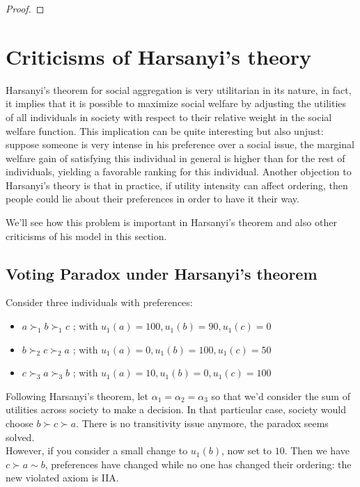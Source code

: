 \documentclass[12pt]{report}
\begin{document}
\begin{proof}

\end{proof}

\section{Criticisms of Harsanyi's  theory}

Harsanyi's theorem for social aggregation is very utilitarian in its nature, in fact, it implies that it is possible to maximize social welfare by adjusting the utilities of all individuals in society with respect to their relative weight in the social welfare function. This implication can be quite interesting but also unjust: suppose someone is very intense in his preference over a social issue, the marginal welfare gain of satisfying this individual in general is higher than for the rest of individuals, yielding a favorable ranking for this individual. Another objection to Harsanyi's theory is that in practice, if utility intensity can affect ordering, then people could lie about their preferences in order to have it their way.

We'll see how this problem is important in Harsanyi's theorem  and also other criticisms of his model in this section.

\subsection{Voting Paradox under Harsanyi's theorem}

Consider three individuals with preferences:\begin{itemize}
\item $a\succ_1b\succ_1c$ ; with $u_1(a) = 100, u_1(b)=90, u_1(c)=0$
\item $b\succ_2c\succ_2a$ ; with $u_1(a) = 0, u_1(b)=100, u_1(c)=50$
\item $c\succ_3a\succ_3b$ ; with $u_1(a) = 10, u_1(b)=0, u_1(c)=100$
\end{itemize}
Following Harsanyi's theorem, let $\alpha_1=\alpha_2=\alpha_3$ so that we'd consider the sum of utilities across society to make a decision. In that particular case, society would choose $b\succ c\succ a$. There is no transitivity issue anymore, the paradox seems solved. \\
However, if you consider a small change to $u_1(b)$, now set to $10$. Then we have $c\succ a\sim b$, preferences have changed while no one has changed their ordering: the new violated axiom is IIA.
\end{document}
